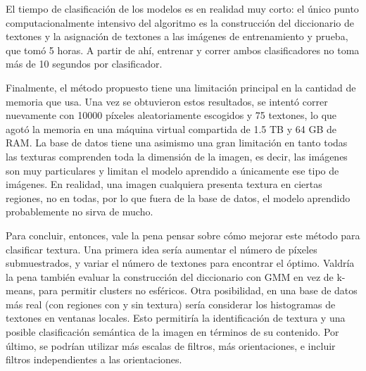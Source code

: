 \documentclass[10pt,twocolumn,letterpaper]{article}
\begin{document}
El tiempo de clasificación de los modelos es en realidad muy corto: el único punto computacionalmente intensivo del algoritmo es la construcción del diccionario de textones y la asignación de textones a las imágenes de entrenamiento y prueba, que tomó 5 horas. A partir de ahí, entrenar y correr ambos clasificadores no toma más de 10 segundos por clasificador. 

Finalmente, el método propuesto tiene una limitación principal en la cantidad de memoria que usa. Una vez se obtuvieron estos resultados, se intentó correr nuevamente con 10000 píxeles aleatoriamente escogidos y 75 textones, lo que agotó la memoria en una máquina virtual compartida de 1.5 TB y 64 GB de RAM. La base de datos tiene una asimismo una gran limitación en tanto todas las texturas comprenden toda la dimensión de la imagen, es decir, las imágenes son muy particulares y limitan el modelo aprendido a únicamente ese tipo de imágenes. En realidad, una imagen cualquiera presenta textura en ciertas regiones, no en todas, por lo que fuera de la base de datos, el modelo aprendido probablemente no sirva de mucho.

Para concluir, entonces, vale la pena pensar sobre cómo mejorar este método para clasificar textura. Una primera idea sería aumentar el número de píxeles submuestrados, y variar el número de textones para encontrar el óptimo. Valdría la pena también evaluar la construcción del diccionario con GMM en vez de k-means, para permitir clusters no esféricos. Otra posibilidad, en una base de datos más real (con regiones con y sin textura) sería considerar los histogramas de textones en ventanas locales. Esto permitiría la identificación de textura y una posible clasificación semántica de la imagen en términos de su contenido. Por último, se podrían utilizar más escalas de filtros, más orientaciones, e incluir filtros independientes a las orientaciones. 





{\small


}
\end{document}
